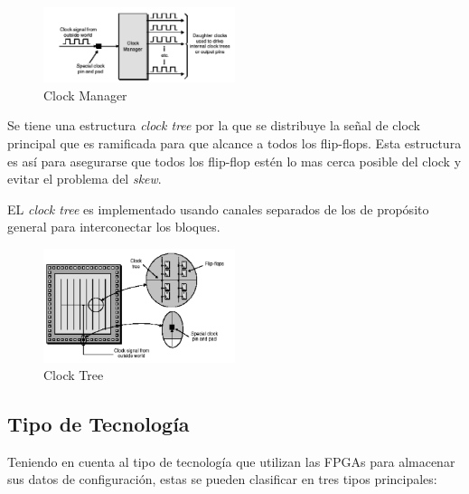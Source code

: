 \begin{figure}[h!]
 \begin{center}
 \includegraphics[width=0.5\textwidth,keepaspectratio=true]{./images/dougther}
  \caption{Clock Manager}
  \label{fig:esquema}
 \end{center}
\end{figure}

Se tiene  una estructura \textit{clock tree} por la que se distribuye la señal de clock principal que es ramificada para que alcance a todos los flip-flops. Esta estructura es así para asegurarse que todos los flip-flop estén lo mas cerca posible del clock y evitar el problema del \textit{skew}.

EL \textit{clock tree} es implementado usando canales separados de los de propósito general para interconectar los bloques.

\begin{figure}[h!]
 \begin{center}
 \includegraphics[width=0.5\textwidth,keepaspectratio=true]{./images/clocktree}
  \caption{Clock Tree}
  \label{fig:esquema}
 \end{center}
\end{figure}

		\subsection{Tipo de Tecnología} 

Teniendo en cuenta al tipo de tecnología que utilizan las FPGAs para almacenar sus datos de configuración, estas se pueden clasificar en tres tipos principales:

